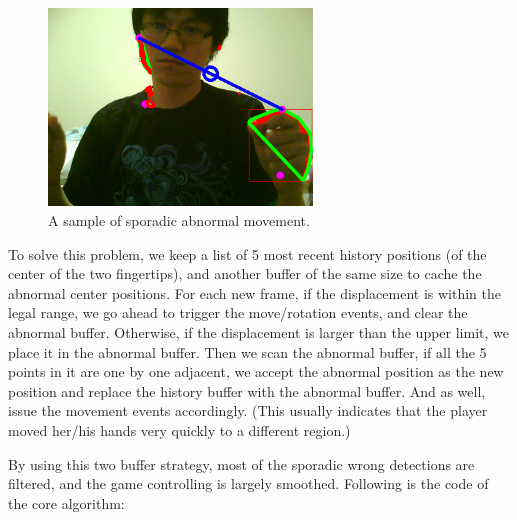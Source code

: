 \documentclass[10pt,twocolumn,letterpaper]{article}
\begin{document}
\begin{figure}[h]
\centering
\includegraphics[width=7cm]{abnormal.png}
\caption{A sample of sporadic abnormal movement.}
\label{fig:abnormal}
\end{figure}

To solve this problem, we keep a list of 5 most recent history positions 
(of the center of the two fingertips), and another buffer of the same size 
to cache the abnormal center positions.  For each new frame, if the displacement 
is within the legal range, we go ahead to trigger the move/rotation events, 
and clear the abnormal buffer. Otherwise, if the displacement is larger than 
the upper limit, we place it in the abnormal buffer. Then we scan the abnormal 
buffer, if all the 5 points in it are one by one adjacent, we accept the abnormal 
position as the new position and replace the history buffer with the abnormal 
buffer. And as well, issue the movement events accordingly. (This usually 
indicates that the player moved her/his hands very quickly to a different region.)

By using this two buffer strategy, most of the sporadic wrong detections are filtered, and the game controlling is largely smoothed. Following is the code of the core algorithm:
\end{document}
